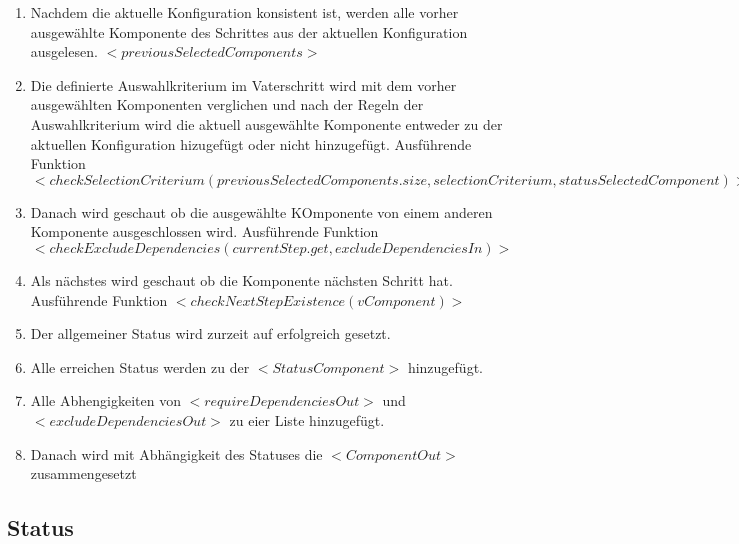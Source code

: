 \documentclass{article}
\begin{document}
\begin{enumerate}
    \item Nachdem die aktuelle Konfiguration konsistent ist, werden
    alle vorher ausgew\"ahlte Komponente des Schrittes aus der
    aktuellen Konfiguration ausgelesen. $<previousSelectedComponents>$
    
    \item Die definierte Auswahlkriterium im Vaterschritt wird mit dem vorher
    ausgew\"ahlten Komponenten verglichen und nach der Regeln der
    Auswahlkriterium wird die aktuell ausgew\"ahlte Komponente entweder zu der
    aktuellen Konfiguration hizugef\"ugt oder nicht hinzugef\"ugt.
    Ausf\"uhrende Funktion $<checkSelectionCriterium(previousSelectedComponents.size, selectionCriterium, statusSelectedComponent)>$
    
    \item Danach wird geschaut ob die ausgew\"ahlte KOmponente von einem anderen
    Komponente ausgeschlossen wird.
    Ausf\"uhrende Funktion $<checkExcludeDependencies(currentStep.get, excludeDependenciesIn)>$
    
    \item Als nächstes wird geschaut ob die Komponente n\"achsten Schritt hat.
    Ausf\"uhrende Funktion $<checkNextStepExistence(vComponent)>$
    
    \item Der allgemeiner Status wird zurzeit auf erfolgreich gesetzt.
    
    \item Alle erreichen Status werden zu der $<StatusComponent>$ hinzugef\"ugt.
    
    \item Alle Abhengigkeiten von $<requireDependenciesOut>$ und
    $<excludeDependenciesOut>$ zu eier Liste hinzugef\"ugt.
    
    \item Danach wird mit Abh\"angigkeit des Statuses die $<ComponentOut>$
    zusammengesetzt
    
\end{enumerate}

\subsection{Status}
\end{document}
